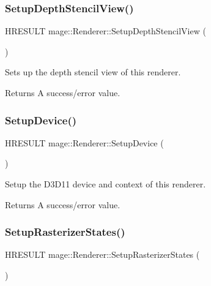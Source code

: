 \subsubsection{\texorpdfstring{Setup\+Depth\+Stencil\+View()}{SetupDepthStencilView()}}
{\footnotesize\ttfamily H\+R\+E\+S\+U\+LT mage\+::\+Renderer\+::\+Setup\+Depth\+Stencil\+View (\begin{DoxyParamCaption}{ }\end{DoxyParamCaption})\hspace{0.3cm}{\ttfamily [private]}}

Sets up the depth stencil view of this renderer.

\begin{DoxyReturn}{Returns}
A success/error value. 
\end{DoxyReturn}
\hypertarget{classmage_1_1_renderer_a4ee0187fb63587a219798523fb8cb7a6}{}\label{classmage_1_1_renderer_a4ee0187fb63587a219798523fb8cb7a6} 
\subsubsection{\texorpdfstring{Setup\+Device()}{SetupDevice()}}
{\footnotesize\ttfamily H\+R\+E\+S\+U\+LT mage\+::\+Renderer\+::\+Setup\+Device (\begin{DoxyParamCaption}{ }\end{DoxyParamCaption})\hspace{0.3cm}{\ttfamily [private]}}

Setup the D3\+D11 device and context of this renderer.

\begin{DoxyReturn}{Returns}
A success/error value. 
\end{DoxyReturn}
\hypertarget{classmage_1_1_renderer_a7f06b86e79a209bc4647a77cb3009c08}{}\label{classmage_1_1_renderer_a7f06b86e79a209bc4647a77cb3009c08} 
\subsubsection{\texorpdfstring{Setup\+Rasterizer\+States()}{SetupRasterizerStates()}}
{\footnotesize\ttfamily H\+R\+E\+S\+U\+LT mage\+::\+Renderer\+::\+Setup\+Rasterizer\+States (\begin{DoxyParamCaption}{ }\end{DoxyParamCaption})\hspace{0.3cm}{\ttfamily [private]}}

